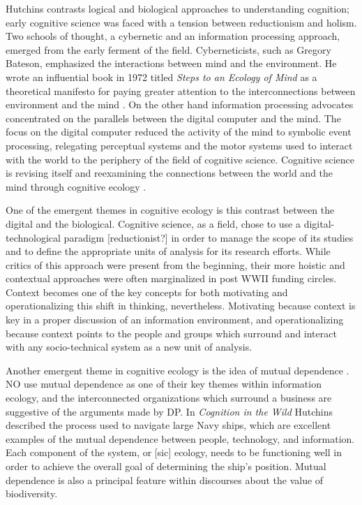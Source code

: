 Hutchins contrasts logical and biological approaches to understanding cognition; early cognitive science was faced with a tension between reductionism and holism. Two schools of thought, a cybernetic and an information processing approach, emerged from the early ferment of the field. Cyberneticists, such as Gregory Bateson, emphasized the interactions between mind and the environment. He wrote an influential book in 1972 titled \textit{Steps to an Ecology of Mind} as a theoretical manifesto for paying greater attention to the interconnections between environment and the mind \citep{bateson_1972}. On the other hand information processing advocates concentrated on the parallels between the digital computer and the mind. The focus on the digital computer reduced the activity of the mind to symbolic event processing, relegating perceptual systems and the motor systems used to interact with the world to the periphery of the field of cognitive science. Cognitive science is revising itself and reexamining the connections between the world and the mind through cognitive ecology \citep{hutchins_cognitive_2010}.

One of the emergent themes in cognitive ecology is this contrast between the digital and the biological. Cognitive science, as a field, chose to use a digital-technological paradigm [reductionist?] in order to manage the scope of its studies and to define the appropriate units of analysis for its research efforts. While critics of this approach were present from the beginning, their more hoistic and contextual approaches were often marginalized in post WWII funding circles. Context becomes one of the key concepts for both motivating and operationalizing this shift in thinking, nevertheless. Motivating because context is key in a proper discussion of an information environment, and operationalizing because context points to the people and groups which surround and interact with any socio-technical system as a new unit of analysis.

Another emergent theme in cognitive ecology is the idea of mutual dependence \citep{hutchins_cognitive_2010}. NO use mutual dependence as one of their key themes within information ecology, and the interconnected organizations which surround a business are suggestive of the arguments made by DP. In \textit{Cognition in the Wild} Hutchins described the process used to navigate large Navy ships, which are excellent examples of the mutual dependence between people, technology, and information. Each component of the system, or [sic] ecology, needs to be functioning well in order to achieve the overall goal of determining the ship's position. Mutual dependence is also a principal feature within discourses about the value of biodiversity.

